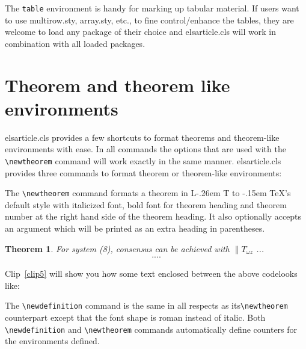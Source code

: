 \documentclass[a4paper,12pt]{article}
\makeatletter
\def\bs{\expandafter\@gobble\string\\}
\def\file#1{\textsf{#1}\xspace}
\DeclareRobustCommand{\LaTeX}{L\kern-.26em%
        {\sbox\z@ T%
         \vbox to\ht\z@{\hbox{\check@mathfonts
           \fontsize\sf@size\z@
           \math@fontsfalse\selectfont
          A\,}%
         \vss}%
        }%
     \kern-.15em%
    \TeX}
\makeatother
\begin{document}
The \verb+table+ environment is handy for marking up tabular
material. If users want to use \file{multirow.sty},
\file{array.sty}, etc., to fine control/enhance the tables, they
are welcome to load any package of their choice and
\file{elsarticle.cls} will work in combination with all loaded
packages.

\section[Theorem and ...]{Theorem and theorem like environments}

\file{elsarticle.cls} provides a few shortcuts to format theorems and
theorem-like environments with ease. In all commands the options that
are used with the \verb+\newtheorem+ command will work exactly in the same
manner. \file{elsarticle.cls} provides three commands to format theorem or
theorem-like environments: 

\begin{vquote}
 \newtheorem{thm}{Theorem}
 \newtheorem{lem}[thm]{Lemma}
\end{vquote}

The \verb+\newtheorem+ command formats a
theorem in \LaTeX's default style with italicized font, bold font
for theorem heading and theorem number at the right hand side of the
theorem heading.  It also optionally accepts an argument which
will be printed as an extra heading in parentheses. 

\begin{vquote}
  \begin{thm} 
   For system (8), consensus can be achieved with 
   $\|T_{\omega z}$
   ...
     \begin{eqnarray}\label{10}
     ....
     \end{eqnarray}
  \end{thm}
\end{vquote}  

Clip~\ref{clip5} will show you how some text enclosed between the
above code\goodbreak \noindent looks like:

\vspace*{6pt}
\def\rulecolor{blue!70}
\src{{\ttfamily\color{verbcolor}\bs newtheorem}}
\def\rulecolor{orange}

The \verb+\newdefinition+ command is the same in
all respects as its\linebreak \verb+\newtheorem+ counterpart except that
the font shape is roman instead of italic.  Both
\verb+\newdefinition+ and \verb+\newtheorem+ commands
automatically define counters for the environments defined.
\end{document}
